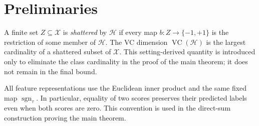 \section{Preliminaries}
\label{sec:preliminaries}

A finite set $Z\subseteq\mathcal X$ is \emph{shattered} by $\mathcal H$ if
every map $b:Z\to\{-1,+1\}$ is the restriction of some member of
$\mathcal H$.  The VC dimension $\operatorname{VC}(\mathcal H)$ is the
largest cardinality of a shattered subset of $\mathcal X$.  This
setting-derived quantity is introduced only to eliminate the class cardinality
in the proof of the main theorem; it does not remain in the final bound.

All feature representations use the Euclidean inner product and the same
fixed map $\operatorname{sgn}_{\tau}$.  In particular, equality of two scores
preserves their predicted labels even when both scores are zero.  This
convention is used in the direct-sum construction proving the main theorem.
